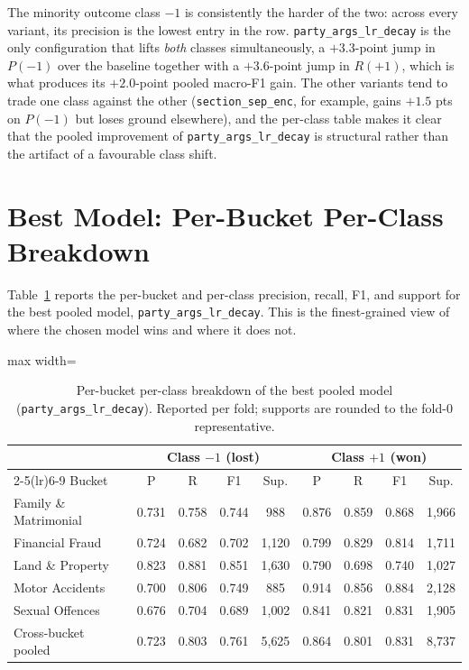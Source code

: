 The minority outcome class $-1$ is consistently the harder of the
two: across every variant, its precision is the lowest entry in the
row. \texttt{party\_args\_lr\_decay} is the only configuration that
lifts \emph{both} classes simultaneously, a $+3.3$-point jump in
$P({-1})$ over the baseline together with a $+3.6$-point jump in
$R({+1})$, which is what produces its $+2.0$-point pooled
macro-F1 gain. The other variants tend to trade one class against
the other (\texttt{section\_sep\_enc}, for example, gains $+1.5$ pts
on $P({-1})$ but loses ground elsewhere), and the per-class table
makes it clear that the pooled improvement of
\texttt{party\_args\_lr\_decay} is structural rather than the
artifact of a favourable class shift.

\section{Best Model: Per-Bucket Per-Class Breakdown}
\label{sec:best_model_breakdown}

Table~\ref{tab:best_per_bucket_per_class} reports the per-bucket and
per-class precision, recall, F1, and support for the best pooled
model, \texttt{party\_args\_lr\_decay}. This is the finest-grained
view of where the chosen model wins and where it does not.

\begin{table}[H]
  \centering
  \scriptsize
  \setlength{\tabcolsep}{5pt}
  \begin{adjustbox}{max width=\textwidth}
  \begin{tabular}{lcccccccc}
    \toprule
    & \multicolumn{4}{c}{Class $-1$ (lost)} & \multicolumn{4}{c}{Class $+1$ (won)} \\
    \cmidrule(lr){2-5}\cmidrule(lr){6-9}
    Bucket & P & R & F1 & Sup. & P & R & F1 & Sup. \\
    \midrule
    Family \& Matrimonial & 0.731 & 0.758 & 0.744 & 988 & 0.876 & 0.859 & 0.868 & 1{,}966 \\
    Financial Fraud & 0.724 & 0.682 & 0.702 & 1{,}120 & 0.799 & 0.829 & 0.814 & 1{,}711 \\
    Land \& Property & 0.823 & 0.881 & 0.851 & 1{,}630 & 0.790 & 0.698 & 0.740 & 1{,}027 \\
    Motor Accidents & 0.700 & 0.806 & 0.749 & 885 & 0.914 & 0.856 & 0.884 & 2{,}128 \\
    Sexual Offences & 0.676 & 0.704 & 0.689 & 1{,}002 & 0.841 & 0.821 & 0.831 & 1{,}905 \\
    \midrule
    Cross-bucket pooled & 0.723 & 0.803 & 0.761 & 5{,}625 & 0.864 & 0.801 & 0.831 & 8{,}737 \\
    \bottomrule
  \end{tabular}
  \end{adjustbox}
  \caption{Per-bucket per-class breakdown of the best pooled model
  (\texttt{party\_args\_lr\_decay}). Reported per fold; supports are
  rounded to the fold-0 representative.}
  \label{tab:best_per_bucket_per_class}
\end{table}

